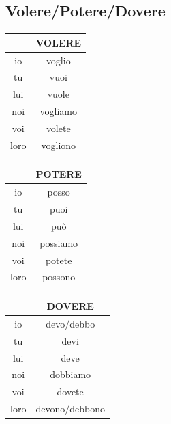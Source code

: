 \documentclass[12pt, openany]{report}
\begin{document}
\subsection{Volere/Potere/Dovere}
\begin{minipage}{.315\textwidth}
    \begin{center}
        \begin{tabular}{c||c}
            & VOLERE \\ \hline
            io & voglio\\
            tu & vuoi\\
            lui & vuole\\
            noi & vogliamo\\
            voi & volete \\
            loro & vogliono \\
        \end{tabular}
    \end{center}
\end{minipage}
\begin{minipage}{.315\textwidth}
    \begin{center}
        \begin{tabular}{c||c}
            & POTERE \\ \hline
            io & posso \\
            tu & puoi \\
            lui & può\\
            noi & possiamo\\
            voi & potete\\
            loro & possono\\
        \end{tabular}
    \end{center}
\end{minipage}
\begin{minipage}{.315\textwidth}
    \begin{center}
        \begin{tabular}{c||c}
            & DOVERE \\ \hline
            io & devo/debbo\\
            tu & devi \\
            lui & deve \\
            noi & dobbiamo \\
            voi & dovete \\
            loro & devono/debbono\\
        \end{tabular}
    \end{center}
\end{minipage}
\end{document}
